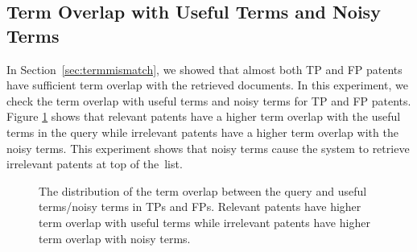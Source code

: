 \subsection{Term Overlap with Useful Terms and Noisy Terms}
In Section~\ref{sec:termmismatch}, we showed that almost both TP and FP patents have sufficient term overlap with the retrieved documents.
In this experiment, we check the term overlap with useful terms and noisy terms for TP and FP patents. Figure \ref{fig:usefulnoisy} shows that relevant patents have a higher term overlap with the useful terms in the query while irrelevant patents have a higher term overlap with the noisy terms. This experiment shows that noisy terms cause the system to retrieve irrelevant patents at top of the~list. 
\begin{figure}[t!]
\begin{centering}
 \hspace*{.5cm}  
\par\end{centering} 

\protect\caption{The distribution of the term overlap between the query and useful terms/noisy terms in TPs and FPs. Relevant patents have higher term overlap with useful terms while irrelevant patents have higher term overlap with noisy terms.}
\label{fig:usefulnoisy}
\end{figure}
